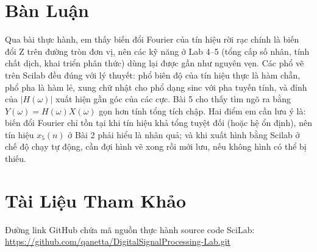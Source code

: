 \documentclass[12pt,a4paper]{article}
\begin{document}
\section{Bàn Luận}
Qua bài thực hành, em thấy biến đổi Fourier của tín hiệu rời rạc chính là biến đổi Z trên đường tròn đơn vị, nên các kỹ năng ở Lab 4--5 (tổng cấp số nhân, tính chất dịch, khai triển phân thức) dùng lại được gần như nguyên vẹn. Các phổ vẽ trên Scilab đều đúng với lý thuyết: phổ biên độ của tín hiệu thực là hàm chẵn, phổ pha là hàm lẻ, xung chữ nhật cho phổ dạng sinc với pha tuyến tính, và đỉnh của $|H(\omega)|$ xuất hiện gần góc của các cực. Bài 5 cho thấy tìm ngõ ra bằng $Y(\omega) = H(\omega)X(\omega)$ gọn hơn tính tổng tích chập. Hai điểm em cần lưu ý là: biến đổi Fourier chỉ tồn tại khi tín hiệu khả tổng tuyệt đối (hoặc hệ ổn định), nên tín hiệu $x_5(n)$ ở Bài 2 phải hiểu là nhân quả; và khi xuất hình bằng Scilab ở chế độ chạy tự động, cần đợi hình vẽ xong rồi mới lưu, nếu không hình có thể bị thiếu.

\section{Tài Liệu Tham Khảo}
Đường link GitHub chứa mã nguồn thực hành source code SciLab: \url{https://github.com/qanetta/DigitalSignalProcessing-Lab.git}
\end{document}

